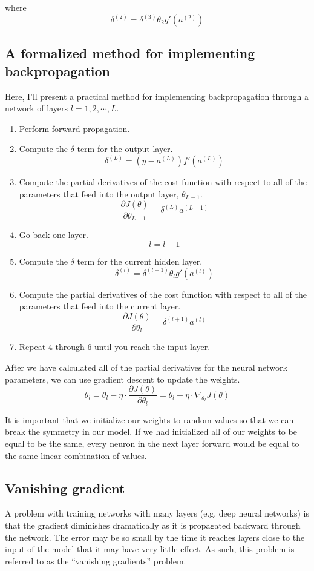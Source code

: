 \documentclass{article}
\begin{document}
where \[  \delta^{(2)} = \delta^{(3)} \theta_2 g'(a^{(2)}) \]


\subsection{A formalized method for implementing backpropagation}
Here, I'll present a practical method for implementing backpropagation through a network of layers $l=1,2,\cdots,L$.
\begin{enumerate}
\item Perform forward propagation.
\item Compute the $\delta$ term for the output layer.
\[ \delta^{(L)} = (y - a^{(L)}) f'(a^{(L)}) \]
\item Compute the partial derivatives of the cost function with respect to all of the parameters that feed into the output layer, $\theta_{L-1}$.
\[ \frac{\partial J(\theta)}{\partial \theta_{L-1}} =  \delta^{(L)} a^{(L-1)} \]
\item Go back one layer.
\[ l = l -1\]

\item Compute the $\delta$ term for the current hidden layer.
\[  \delta^{(l)} = \delta^{(l+1)} \theta_l g'(a^{(l)}) \]

\item Compute the partial derivatives of the cost function with respect to all of the parameters that feed into the current layer.
\[ \frac{\partial J(\theta)}{\partial \theta_{l}} =  \delta^{(l+1)} a^{(l)} \]
\item Repeat 4 through 6 until you reach the input layer.
\end{enumerate}
After we have calculated all of the partial derivatives for the neural network parameters, we can use gradient descent to update the weights.
\[\theta_l = \theta_l - \eta \cdot \frac{\partial J(\theta)}{\partial \theta_{l}} = \theta_l - \eta \cdot \nabla_{\theta_l} J( \theta)\]


It is important that we initialize our weights to random values so that we can break the symmetry in our model. If we had initialized all of our weights to be equal to be the same, every neuron in the next layer forward would be equal to the same linear combination of values.

\subsection{Vanishing gradient}

A problem with training networks with many layers (e.g. deep neural networks) is that the gradient diminishes dramatically as it is propagated backward through the network. The error may be so small by the time it reaches layers close to the input of the model that it may have very little effect. As such, this problem is referred to as the ``vanishing gradients'' problem.
\end{document}
